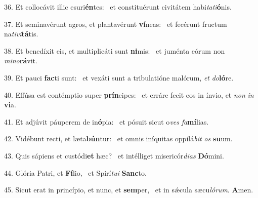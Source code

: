 36. Et collocávit illic esuri\textbf{én}tes: \ast\  et constituérunt civitátem habi\textit{ta}\textit{ti}\textbf{ó}nis.\

37. Et seminavérunt agros, et plantavérunt \textbf{ví}neas: \ast\  et fecérunt fructum na\textit{ti}\textit{vi}\textbf{tá}tis.\

38. Et benedíxit eis, et multiplicáti sunt \textbf{ni}mis: \ast\  et juménta eórum non \textit{mi}\textit{no}\textbf{rá}vit.\

39. Et pauci \textbf{fac}ti sunt: \ast\  et vexáti sunt a tribulatióne malórum, \textit{et} \textit{do}\textbf{ló}re.\

40. Effúsa est contémptio super \textbf{prín}cipes: \ast\  et erráre fecit eos in ínvio, et \textit{non} \textit{in} \textbf{vi}a.\

41. Et adjúvit páuperem de in\textbf{ó}pia: \ast\  et pósuit sicut o\textit{ves} \textit{fa}\textbf{mí}lias.\

42. Vidébunt recti, et læta\textbf{bún}tur: \ast\  et omnis iníquitas oppilá\textit{bit} \textit{os} \textbf{su}um.\

43. Quis sápiens et custódi\textbf{et} hæc? \ast\  et intélliget misericór\textit{di}\textit{as} \textbf{Dó}mini.\

44. Glória Patri, et \textbf{Fí}lio, \ast\  et Spirí\textit{tu}\textit{i} \textbf{Sanc}to.\

45. Sicut erat in princípio, et nunc, et \textbf{sem}per, \ast\  et in sǽcula sæcu\textit{ló}\textit{rum}. \textbf{A}men.\

